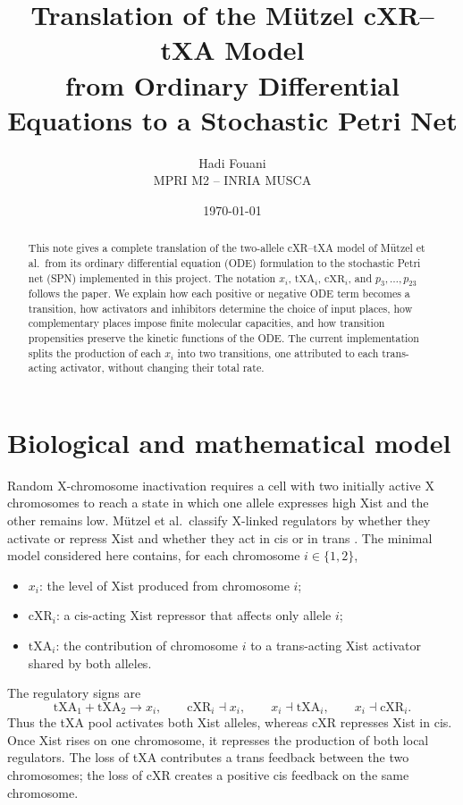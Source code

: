\documentclass[11pt,a4paper]{article}
\title{Translation of the M\"utzel cXR--tXA Model\\
from Ordinary Differential Equations to a Stochastic Petri Net}
\author{Hadi Fouani\\MPRI M2 -- INRIA MUSCA}
\date{\today}
\newcommand{\txa}{\mathrm{tXA}}
\newcommand{\cxr}{\mathrm{cXR}}
\begin{document}
\maketitle

\begin{abstract}
This note gives a complete translation of the two-allele cXR--tXA model of
M\"utzel et al.\ from its ordinary differential equation (ODE) formulation to
the stochastic Petri net (SPN) implemented in this project.  The notation
$x_i$, $\txa_i$, $\cxr_i$, and $p_3,\ldots,p_{23}$ follows the paper.  We
explain how each positive or negative ODE term becomes a transition, how
activators and inhibitors determine the choice of input places, how
complementary places impose finite molecular capacities, and how transition
propensities preserve the kinetic functions of the ODE.  The current
implementation splits the production of each $x_i$ into two transitions, one
attributed to each trans-acting activator, without changing their total rate.
\end{abstract}

\tableofcontents

\section{Biological and mathematical model}

Random X-chromosome inactivation requires a cell with two initially active X
chromosomes to reach a state in which one allele expresses high Xist and the
other remains low.  M\"utzel et al.\ classify X-linked regulators by whether
they activate or repress Xist and whether they act in cis or in trans
\cite{mutzel2019}.  The minimal model considered here contains, for each
chromosome $i\in\{1,2\}$,
\begin{itemize}
  \item $x_i$: the level of Xist produced from chromosome $i$;
  \item $\cxr_i$: a cis-acting Xist repressor that affects only allele $i$;
  \item $\txa_i$: the contribution of chromosome $i$ to a trans-acting Xist
        activator shared by both alleles.
\end{itemize}

The regulatory signs are
\[
  \txa_1+\txa_2 \longrightarrow x_i,
  \qquad
  \cxr_i \dashv x_i,
  \qquad
  x_i \dashv \txa_i,
  \qquad
  x_i \dashv \cxr_i.
\]
Thus the tXA pool activates both Xist alleles, whereas cXR represses Xist in
cis.  Once Xist rises on one chromosome, it represses the production of both
local regulators.  The loss of tXA contributes a trans feedback between the
two chromosomes; the loss of cXR creates a positive cis feedback on the same
chromosome.
\end{document}
